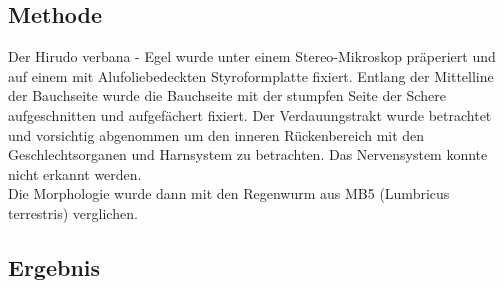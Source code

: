 \documentclass[oneside,10pt,a4paper]{report}
\begin{document}
				
			\subsection{Methode}
				Der Hirudo verbana - Egel wurde unter einem Stereo-Mikroskop präperiert und auf einem mit Alufoliebedeckten Styroformplatte fixiert. Entlang der Mittelline der Bauchseite wurde die Bauchseite mit der stumpfen Seite der Schere aufgeschnitten und aufgefächert fixiert. Der Verdauungstrakt wurde betrachtet und vorsichtig abgenommen um den inneren Rückenbereich mit den Geschlechtsorganen und Harnsystem zu betrachten. Das Nervensystem konnte nicht erkannt werden.\\
				Die Morphologie wurde dann mit den Regenwurm aus MB5 (Lumbricus terrestris) verglichen.
			\subsection{Ergebnis}
				
\end{document}
